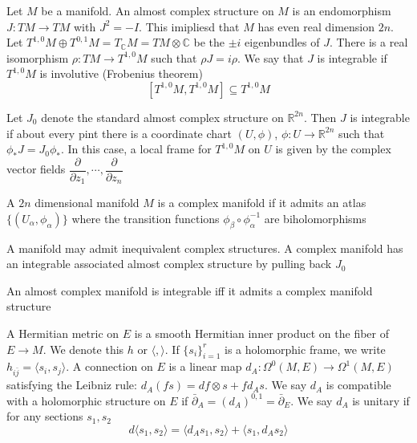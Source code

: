 \documentclass[../main.tex]{subfiles}
\begin{document}
\begin{definition}
Let $M$ be a manifold. An almost complex structure on $M$ is an endomorphism $J:TM\to TM$ with $J^2=-I$. This imipliesd that $M$ has even real dimension $2n$. Let $T^{1,0}M\oplus T^{0,1}M=T_{\mathbb C}M=TM\otimes\mathbb C$ be the $\pm i$ eigenbundles of $J$. There is a real isomorphism $\rho:TM\to T^{1,0}M$ such that $\rho J=i\rho$. We say that $J$ is integrable if $T^{1,0}M$ is involutive (Frobenius theorem)
\[[T^{1,0}M,T^{1,0}M]\subseteq T^{1,0}M\]
\end{definition}

Let $J_0$ denote the standard almost complex structure on $\mathbb R^{2n}$. Then $J$ is integrable if about every pint there is a coordinate chart $(U,\phi)$, $\phi:U\to\mathbb R^{2n}$ such that $\phi_*J=J_0\phi_*$. In this case, a local frame for $T^{1,0}M$ on $U$ is given by the complex vector fields $\dfrac{\partial}{\partial z_1},\cdots,\dfrac{\partial}{\partial z_n}$

\begin{definition}
A $2n$ dimensional manifold $M$ is a complex manifold if it admits an atlas $\{(U_\alpha,\phi_\alpha)\}$ where the transition functions $\phi_\beta\circ\phi_\alpha^{-1}$ are biholomorphisms
\end{definition}

\begin{note}
A manifold may admit inequivalent complex structures. A complex manifold has an integrable associated almost complex structure by pulling back $J_0$
\end{note}

\begin{theorem}
An almost complex manifold is integrable iff it admits a complex manifold structure
\end{theorem}

\begin{definition}
A Hermitian metric on $E$ is a smooth Hermitian inner product on the fiber of $E\to M$. We denote this $h$ or $\langle,\rangle$. If $\{s_i\}_{i=1}^r$ is a holomorphic frame, we write $h_{i\bar j}=\langle s_i,s_j\rangle$. A connection on $E$ is a linear map $d_A:\Omega^0(M,E)\to\Omega^1(M,E)$ satisfying the Leibniz rule: $d_A(fs)=df\otimes s+fd_As$. We say $d_A$ is compatible with a holomorphic structure on $E$ if $\bar\partial_A=(d_A)^{0,1}=\bar\partial_E$. We say $d_A$ is unitary if for any sections $s_1,s_2$
\[d\langle s_1,s_2\rangle=\langle d_As_1,s_2\rangle+\langle s_1,d_As_2\rangle\]
\end{definition}
\end{document}
